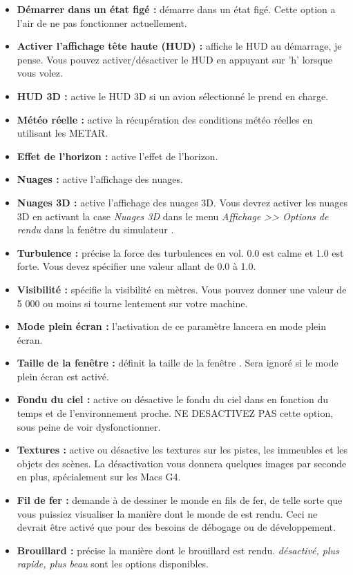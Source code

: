 {\begin{itemize}
\item \textbf{D\'{e}marrer dans un \'{e}tat fig\'{e} :} d\'{e}marre \FlightGear{} dans un \'{e}tat fig\'{e}. Cette option a l'air de ne pas fonctionner actuellement.
\item \textbf{Activer l'affichage t\^{e}te haute (HUD) :} affiche le HUD au d\'{e}marrage, je pense. Vous pouvez activer/d\'{e}sactiver le HUD en appuyant sur 'h' lorsque vous volez.
\item \textbf{HUD 3D :} active le HUD 3D si un avion s\'{e}lectionn\'{e} le prend en charge.
\item \textbf{M\'{e}t\'{e}o r\'{e}elle :} active la r\'{e}cup\'{e}ration des conditions m\'{e}t\'{e}o r\'{e}elles en utilisant les METAR.
\item \textbf{Effet de l'horizon :} active l'effet de l'horizon.
\item \textbf{Nuages :} active l'affichage des nuages.
\item \textbf{Nuages 3D :} active l'affichage des nuages 3D. Vous devrez activer les nuages 3D en activant la case \textit{Nuages 3D} dans le menu \textit{Affichage >> Options de rendu} dans la fen\^{e}tre du simulateur \FlightGear{}. 
\item \textbf{Turbulence :} pr\'{e}cise la force des turbulences en vol. 0.0 est calme et 1.0 est forte. Vous devez sp\'{e}cifier une valeur allant de 0.0 \`{a} 1.0.
\item \textbf{Visibilit\'{e} :} sp\'{e}cifie la visibilit\'{e} en m\`{e}tres. Vous pouvez donner une valeur de 5 000 ou moins si \FlightGear{} tourne lentement sur votre machine.
\item \textbf{Mode plein \'{e}cran :} l'activation de ce param\`{e}tre lancera \FlightGear{} en mode plein \'{e}cran.
\item \textbf{Taille de la fen\^{e}tre :} d\'{e}finit la taille de la fen\^{e}tre \FlightGear{}. Sera ignor\'{e} si le mode plein \'{e}cran est activ\'{e}.
\item \textbf{Fondu du ciel :} active ou d\'{e}sactive le fondu du ciel dans \FlightGear{} en fonction du temps et de l'environnement proche. NE DESACTIVEZ PAS cette option, sous peine de voir \FlightGear{} dysfonctionner.
\item \textbf{Textures :} active ou d\'{e}sactive les textures sur les pistes, les immeubles et les objets des sc\`{e}nes. La d\'{e}sactivation vous donnera quelques images par seconde en plus, sp\'{e}cialement sur les Macs G4.
\item \textbf{Fil de fer :} demande \`{a} \FlightGear{} de dessiner le monde en fils de fer, de telle sorte que vous puissiez visualiser la mani\`{e}re dont le monde de \FlightGear{} est rendu. Ceci ne devrait \^{e}tre activ\'{e} que pour des besoins de d\'{e}bogage ou de d\'{e}veloppement.
\item \textbf{Brouillard :} pr\'{e}cise la mani\`{e}re dont le brouillard est rendu. \textit{d\'{e}sactiv\'{e}, plus rapide, plus beau} sont les options disponibles.
\end{itemize}
}{}

